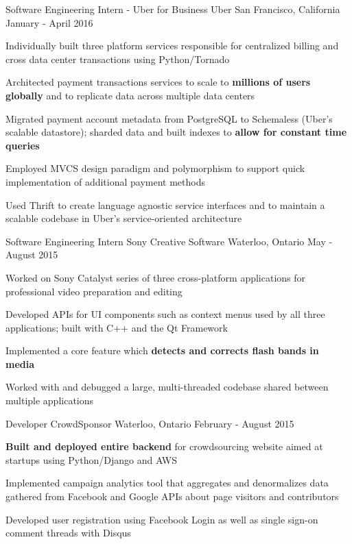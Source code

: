 \begin{cventries}
  \cventry
    {Software Engineering Intern - Uber for Business}
    {Uber}
    {San Francisco, California}
    {January - April 2016}
    {
      \begin{cvitems}
      \item Individually built three platform services responsible for centralized billing and cross data center transactions using Python/Tornado
      \item Architected payment transactions services to scale to \textbf{millions of users globally} and to replicate data across multiple data centers
      \item Migrated payment account metadata from PostgreSQL to Schemaless (Uber's scalable datastore); sharded data and built indexes to \textbf{allow for constant time queries}
      \item Employed MVCS design paradigm and polymorphism to support quick implementation of additional payment methods
      \item Used Thrift to create language agnostic service interfaces and to maintain a scalable codebase in Uber's service-oriented architecture
      \end{cvitems}
    }
  \cventry
    {Software Engineering Intern}
    {Sony Creative Software}
    {Waterloo, Ontario}
    {May - August 2015}
    {
      \begin{cvitems}
        \item Worked on Sony Catalyst series of three cross-platform applications for professional video preparation and editing
        \item Developed APIs for UI components such as context menus used by all three applications; built with C++ and the Qt Framework
        \item Implemented a core feature which \textbf{detects and corrects flash bands in media}
        \item Worked with and debugged a large, multi-threaded codebase shared between multiple applications
      \end{cvitems}
    }
  \cventry
    {Developer}
    {CrowdSponsor}
    {Waterloo, Ontario}
    {February - August 2015}
    {
      \begin{cvitems}
        \item \textbf{Built and deployed entire backend} for crowdsourcing website aimed at startups using Python/Django and AWS
        \item Implemented campaign analytics tool that aggregates and denormalizes data gathered from Facebook and Google APIs about page visitors and contributors
        \item Developed user registration using Facebook Login as well as single sign-on comment threads with Disqus
      \end{cvitems}
    }
\end{cventries}
